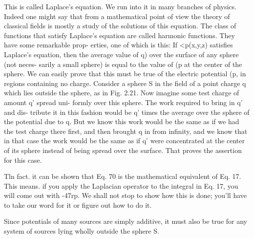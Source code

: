This is called Laplace's equation. We run into it in many branches
of physics. Indeed one might say that from a mathematical point of
view the theory of classical fields is mostly a study of the solutions of
this equation. The class of functions that satisfy Laplace's equation
are called harmonic functions. They have some remarkable prop-
erties, one of which is this: If <p(x,y,z) satisfies Laplace's equation,
then the average value of q) over the surface of any sphere (not neces-
sarily a small sphere) is equal to the value of (p at the center of the
sphere. We can easily prove that this must be true of the electric
potential (p, in regions containing no charge. Consider a sphere S
in the field of a point charge q which lies outside the sphere, as in
Fig. 2.21. Now imagine some test charge of amount q' spread uni-
formly over this sphere. The work required to bring in q' and dis-
tribute it in this fashion would be q' times the average over the sphere
of the potential due to q. But we know this work would be the same
as if we had the test charge there first, and then brought q in from
infinity, and we know that in that case the work would be the same as
if q' were concentrated at the center of its sphere instead of being
spread over the surface. That proves the assertion for this case.

Tln fact. it can be shown that Eq. 70 is the mathematical equivalent of Eq. 17. This
means. if you apply the Laplacian operator to the integral in Eq. 17, you will come
out with -47rp. We shall not stop to show how this is done; you'll have to take our
word for it or figure out how to do it.

Since potentials of many sources are simply additive, it must also be
true for any system of sources lying wholly outside the sphere S.

